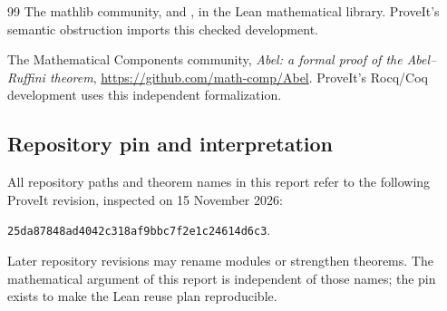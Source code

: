\begin{thebibliography}{99}
The mathlib community,
 and
, in the Lean mathematical
library.  ProveIt's semantic obstruction imports this checked development.

The Mathematical Components community,
\emph{Abel: a formal proof of the Abel--Ruffini theorem},
\url{https://github.com/math-comp/Abel}.
ProveIt's Rocq/Coq development uses this independent formalization.

\end{thebibliography}

\subsection*{Repository pin and interpretation}

All repository paths and theorem names in this report refer to the following
ProveIt revision, inspected on 15 November 2026:
\begin{center}
\small\texttt{25da87848ad4042c318af9bbc7f2e1c24614d6c3}.
\end{center}
Later repository revisions may rename modules or strengthen theorems.  The
mathematical argument of this report is independent of those names; the pin
exists to make the Lean reuse plan reproducible.
